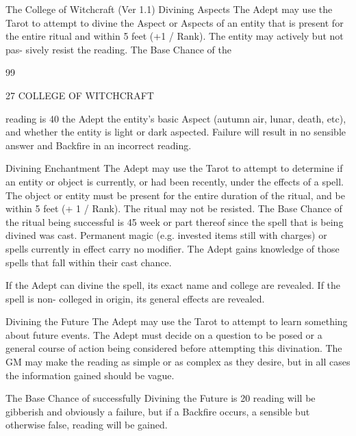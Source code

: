\begin{Chapter}{The College of Witchcraft (Ver 1.1)}
Divining Aspects The Adept may use the Tarot to 
attempt to divine the Aspect or Aspects of an entity 
that is present for the entire ritual and within 5 feet 
(+1  /  Rank).  The  entity  may  actively  but  not  pas-
sively  resist  the  reading.  The  Base  Chance  of  the 

99 

27 COLLEGE OF WITCHCRAFT 

reading is 40%
the  Adept  the  entity’s  basic  Aspect  (autumn  air, 
lunar, death, etc), and whether the entity is light or 
dark  aspected.  Failure  will  result  in  no  sensible 
answer and Backfire in an incorrect reading. 

Divining  Enchantment  The  Adept  may  use  the 
Tarot to attempt to determine if an entity or object 
is currently, or had been recently, under the effects 
of a spell. The object or entity must be present for 
the  entire  duration  of  the  ritual,  and  be  within  5 
feet  (+  1  /  Rank).  The  ritual  may  not  be  resisted. 
The  Base  Chance  of  the  ritual  being  successful  is 
45%
week  or  part  thereof  since  the  spell  that  is  being 
divined  was  cast.  Permanent  magic  (e.g.  invested 
items still with charges) or spells currently in effect 
carry  no  modifier.  The  Adept  gains  knowledge  of 
those spells that fall within their cast chance. 

If  the  Adept  can  divine  the  spell,  its  exact  name 
and  college  are  revealed.  If  the  spell  is  non-
colleged in origin, its general effects are revealed. 

Divining the Future The Adept may use the Tarot 
to  attempt  to  learn  something  about  future  events. 
The  Adept  must  decide  on  a  question  to  be  posed 
or  a  general  course  of  action  being  considered 
before  attempting  this  divination.  The  GM  may 
make  the  reading  as  simple  or  as  complex  as  they 
desire,  but  in  all  cases  the  information  gained 
should be vague. 

The  Base  Chance  of  successfully  Divining  the 
Future  is  20%
reading  will  be  gibberish  and  obviously  a  failure, 
but  if  a  Backfire  occurs,  a  sensible  but  otherwise 
false, reading will be gained. 


\end{Chapter}
